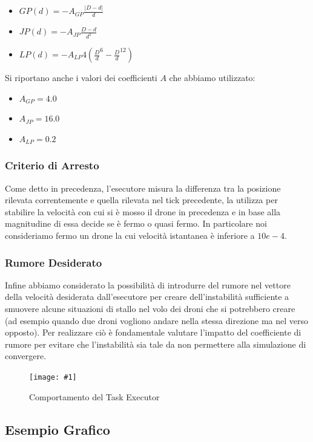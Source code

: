 \documentclass[a4paper,11pt,oneside, table]{article}
\newcommand{\putimage}[4] {
	\begin{figure}[H]
	    \centering
	    \texttt{[image: \#1]}
	    \caption{#2}\label{#3}
	\end{figure}
}
\begin{document}
\begin{itemize}
  \item $GP(d) = -A_{GP} \frac {|D - d|} {d}$
  \item $JP(d) = -A_{JP} \frac {D - d} {d^2}$
  \item $LP(d) = -A_{LP} 4 ({\frac {D} {d}}^6 - {\frac {D} {d}}^{12})$
\end{itemize}

Si riportano anche i valori dei coefficienti $A$ che abbiamo utilizzato:

\begin{itemize}
  \item $A_{GP} = 4.0$
  \item $A_{JP} = 16.0$
  \item $A_{LP} = 0.2$
\end{itemize}

\subsubsection{Criterio di Arresto}
Come detto in precedenza, l'esecutore misura la differenza tra la posizione rilevata correntemente e quella rilevata nel tick precedente, la utilizza per stabilire la velocit\`a con cui si \`e mosso il drone in precedenza e in base alla magnitudine di essa decide se \`e fermo o quasi fermo.
In particolare noi consideriamo fermo un drone la cui velocit\`a istantanea \`e inferiore a $10e-4$.

\subsubsection{Rumore Desiderato}
Infine abbiamo considerato la possibilit\`a di introdurre del rumore nel vettore della velocit\`a desiderata dall'esecutore per creare dell'instabilit\`a sufficiente a smuovere alcune situazioni di stallo nel volo dei droni che si potrebbero creare (ad esempio quando due droni vogliono andare nella stessa direzione ma nel verso opposto).
Per realizzare ci\`o \`e fondamentale valutare l'impatto del coefficiente di rumore per evitare che l'instabilit\`a sia tale da non permettere alla simulazione di convergere.

\putimage{images/task-executor.png}{Comportamento del Task Executor}{png:task-executor}{0.99}

\subsection{Esempio Grafico}
\end{document}
